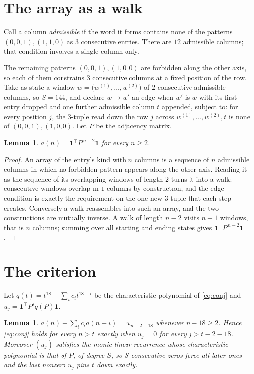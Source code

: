\documentclass[11pt,a4paper]{article}
\theoremstyle{plain}
\newtheorem{lemma}[theorem]{Lemma}
\theoremstyle{definition}
\begin{document}
\section{The array as a walk}

Call a column \emph{admissible} if the word it forms contains none of the patterns
$(0,0,1), (1,1,0)$ as $3$ consecutive entries. There are $12$ admissible columns; that condition
involves a single column only.

The remaining patterns $(0,0,1), (1,0,0)$ are forbidden along the other axis, so each of them
constrains $3$ consecutive columns at a fixed position of the row. Take as state a
window $w=\bigl(w^{(1)},\dots,w^{(2)}\bigr)$ of $2$ consecutive admissible
columns, so $S=144$, and declare $w\to w'$ an edge when $w'$ is $w$ with its first entry
dropped and one further admissible column $t$ appended, subject to: for every position
$j$, the $3$-tuple read down the row $j$ across $w^{(1)},\dots,w^{(2)},t$
is none of $(0,0,1), (1,0,0)$. Let $P$ be the adjacency matrix.

\begin{lemma}\label{lem:walk}
$a(n)=\mathbf{1}^{\!\top}P^{\,n-2}\mathbf{1}$ for every $n\ge2$.
\end{lemma}

\begin{proof}
An array of the entry's kind with $n$ columns is a sequence of $n$ admissible columns in
which no forbidden pattern appears along the other axis. Reading it as the sequence of its
overlapping windows of length $2$ turns it into a walk: consecutive windows overlap in
$1$ columns by construction, and the edge condition is exactly the requirement on the one
new $3$-tuple that each step creates. Conversely a walk reassembles into such an array,
and the two constructions are mutually inverse. A walk of length $n-2$ visits $n-1$
windows, that is $n$ columns; summing over all starting and ending states gives
$\mathbf{1}^{\!\top}P^{\,n-2}\mathbf{1}$.
\end{proof}

\section{The criterion}

Let $q(t)=t^{18}-\sum_i c_i t^{18-i}$ be the characteristic polynomial of
\eqref{eq:conj} and $u_j=\mathbf{1}^{\!\top}P^{j}q(P)\mathbf{1}$.

\begin{lemma}\label{lem:crit}
$a(n)-\sum_i c_i a(n-i)=u_{\,n-2-18}$ whenever $n-18\ge2$. Hence
\eqref{eq:conj} holds for every $n>t$ exactly when $u_j=0$ for every
$j>t-2-18$. Moreover $(u_j)$ satisfies the monic linear recurrence whose
characteristic polynomial is that of $P$, of degree $S$, so $S$ consecutive zeros force all
later ones and the last nonzero $u_j$ pins $t$ down exactly.
\end{lemma}
\end{document}
